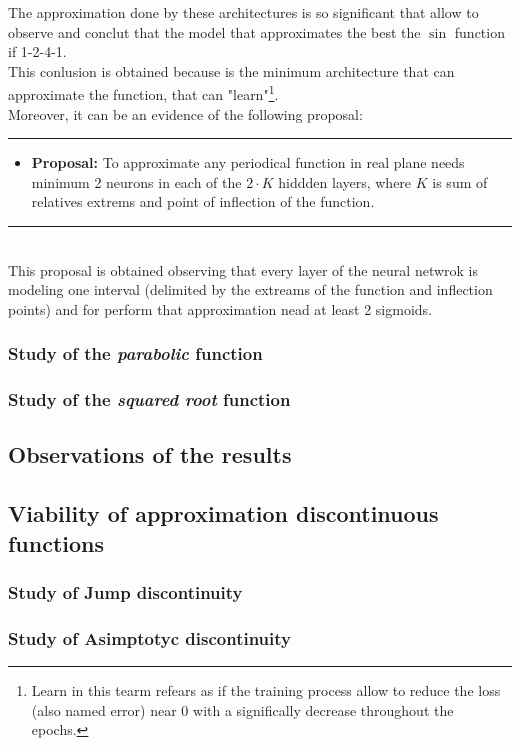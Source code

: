\documentclass[a4paper, 11pt]{article}
\begin{document}
The approximation done by these architectures is so significant that allow to observe and conclut that the model that approximates the best the $\sin$ function if 1-2-4-1.\\
This conlusion is obtained because is the minimum architecture that can approximate the function, that can "learn"\footnote{Learn in this tearm refears as if the training process allow to reduce the loss (also named error) near 0 with a significally decrease throughout the epochs.}.\\
Moreover, it can be an evidence of the following proposal:\\
\rule{\linewidth}{0.4pt}
\begin{itemize}
    \item \textbf{Proposal:} To approximate any periodical function in real plane needs minimum 2 neurons in each of the $2\cdot K$ hiddden layers, where $K$ is sum of relatives extrems and point of inflection of the function.
\end{itemize}
\rule{\linewidth}{0.4pt}\\ \vspace{0.5em}
This proposal is obtained observing that every layer of the neural netwrok is modeling one interval (delimited by the extreams of the function and inflection points) and for perform that approximation nead at least 2 sigmoids.

\subsubsection{Study of the \textit{parabolic} function}
\subsubsection{Study of the \textit{squared root} function}

\newpage
\subsection{Observations of the results}
\subsection{Viability of approximation discontinuous functions}
\subsubsection{Study of Jump discontinuity}
\subsubsection{Study of Asimptotyc discontinuity}
\end{document}
